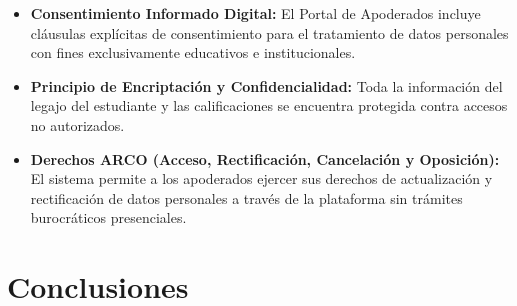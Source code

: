 \documentclass[12pt,a4paper,oneside]{report}
\begin{document}
\begin{itemize}
    \item \textbf{Consentimiento Informado Digital:} El Portal de Apoderados incluye cláusulas explícitas de consentimiento para el tratamiento de datos personales con fines exclusivamente educativos e institucionales.
    \item \textbf{Principio de Encriptación y Confidencialidad:} Toda la información del legajo del estudiante y las calificaciones se encuentra protegida contra accesos no autorizados.
    \item \textbf{Derechos ARCO (Acceso, Rectificación, Cancelación y Oposición):} El sistema permite a los apoderados ejercer sus derechos de actualización y rectificación de datos personales a través de la plataforma sin trámites burocráticos presenciales.
\end{itemize}

\chapter*{Conclusiones}
\end{document}
